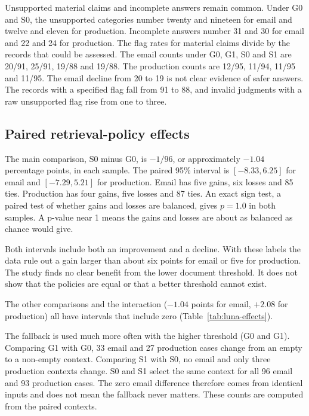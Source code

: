 Unsupported material claims and incomplete answers remain common. Under G0 and S0, the unsupported categories number twenty and nineteen for email and twelve and eleven for production. Incomplete answers number 31 and 30 for email and 22 and 24 for production. The flag rates for material claims divide by the records that could be assessed. The email counts under G0, G1, S0 and S1 are 20/91, 25/91, 19/88 and 19/88. The production counts are 12/95, 11/94, 11/95 and 11/95. The email decline from 20 to 19 is not clear evidence of safer answers. The records with a specified flag fall from 91 to 88, and invalid judgments with a raw unsupported flag rise from one to three.

\subsection{Paired retrieval-policy effects}



The main comparison, S0 minus G0, is $-1/96$, or approximately $-1.04$ percentage points, in each sample. The paired 95\% interval is $[-8.33,6.25]$ for email and $[-7.29,5.21]$ for production. Email has five gains, six losses and 85 ties. Production has four gains, five losses and 87 ties. An exact sign test, a paired test of whether gains and losses are balanced, gives $p=1.0$ in both samples. A p-value near 1 means the gains and losses are about as balanced as chance would give.

Both intervals include both an improvement and a decline. With these labels the data rule out a gain larger than about six points for email or five for production. The study finds no clear benefit from the lower document threshold. It does not show that the policies are equal or that a better threshold cannot exist.

The other comparisons and the interaction ($-1.04$ points for email, $+2.08$ for production) all have intervals that include zero (Table~\ref{tab:luna-effects}).

The fallback is used much more often with the higher threshold (G0 and G1). Comparing G1 with G0, 33 email and 27 production cases change from an empty to a non-empty context. Comparing S1 with S0, no email and only three production contexts change. S0 and S1 select the same context for all 96 email and 93 production cases. The zero email difference therefore comes from identical inputs and does not mean the fallback never matters. These counts are computed from the paired contexts.

